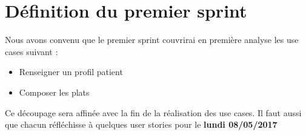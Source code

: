 \documentclass[11pt,a4paper,french,twoside,openright]{article}
\begin{document}
\section{Définition du premier sprint}
\noindent Nous avons convenu que le premier sprint couvrirai en première analyse les use
cases suivant :
\begin{itemize}
   \item Renseigner un profil patient
   \item Composer les plats
\end{itemize}
Ce découpage sera affinée avec la fin de la réalisation des use cases. Il faut
aussi que chacun réfléchisse à quelques user stories pour
le \textbf{lundi 08/05/2017}


\label{LastPage}
\end{document}
